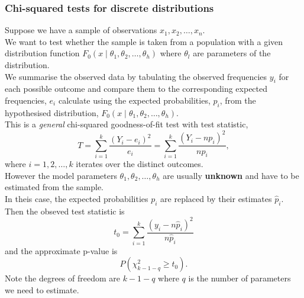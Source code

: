 \documentclass[a4paper]{article}\usepackage[]{graphicx}\usepackage[]{xcolor}
\begin{document}
\subsubsection{Chi-squared tests for discrete distributions}
Suppose we have a sample of observations \( x_1,x_2,\dotsc,x_n \).\\
We want to test whether the sample is taken from a population with a given distribution function \( F_0 (x \mid \theta_1, \theta_2, \dotsc, \theta_h) \) where \( \theta_l \) are parameters of the distribution.\\
We summarise the observed data by tabulating the observed frequencies \( y_i \) for each possible outcome and compare them to the corresponding expected frequencies, \( e_i \) calculate using the expected probabilities, \( p_i \), from the hypothesised distribution, \( F_0 (x \mid \theta_1, \theta_2, \dotsc, \theta_h) \).\\
This is a \textit{general} chi-squared goodness-of-fit test with test statistic,
\[
	T = \sum_{i=1}^{k} \frac{(Y_i - e_i)^2}{e_i} = \sum_{i=1}^{k}\frac{(Y_i - np_i)^2}{np_i},
\]
where \( i = 1,2,\dotsc,k \) iterates over the distinct outcomes.\\
However the model parameters \( \theta_1, \theta_2,\dotsc,\theta_h \) are usually \textbf{unknown} and have to be estimated from the sample.\\
In theis case, the expected probabilities \( p_i \) are replaced by their estimates \( \hat{p}_i \).\\
Then the obseved test statistic is
\[
	t_0 = \sum_{i=1}^{k} \frac{(y_i - n\hat{p}_i)^2}{n \hat{p}_i}
\]
and the approximate p-value is
\[
	P(\chi^2_{k-1-q} \geq t_0).
\]
Note the degrees of freedom are \( k-1-q \) where \( q \) is the number of parameters we need to estimate.
\end{document}
